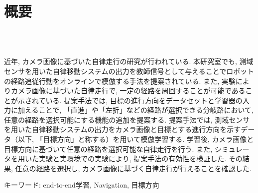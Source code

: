 \chapter*{概要}
\thispagestyle{empty}
%
\begin{center}
  \scalebox{1.5}{視覚と行動のend-to-end学習により}\\
  \scalebox{1.5}{経路追従行動をオンラインで模倣する手法の提案}\\
  \scalebox{1.5}{（目標方向による経路選択機能の追加と検証）}
\end{center}
\vspace{1.0zh}
%
近年, カメラ画像に基づいた自律走行の研究が行われている. 本研究室でも, 測域センサを用いた自律移動システムの出力を教師信号として与えることでロボットの経路追従行動をオンラインで模倣する手法を提案されている. また, 実験によりカメラ画像に基づいた自律走行で, 一定の経路を周回することが可能であることが示されている. 提案手法では, 目標の進行方向をデータセットと学習器の入力に加えることで, 「直進」や「左折」などの経路が選択できる分岐路において, 任意の経路を選択可能にする機能の追加を提案する. 提案手法では, 測域センサを用いた自律移動システムの出力をカメラ画像と目標とする進行方向を示すデータ（以下, 「目標方向」と称する）を用いて模倣学習する. 学習後, カメラ画像と目標方向に基づいて任意の経路を選択可能な自律走行を行う. また, シミュレータを用いた実験と実環境での実験により, 提案手法の有効性を検証した. その結果, 任意の経路を選択し, カメラ画像に基づく自律走行が行えることを確認した.

キーワード: end-to-end学習, Navigation, 目標方向
%
\newpage
